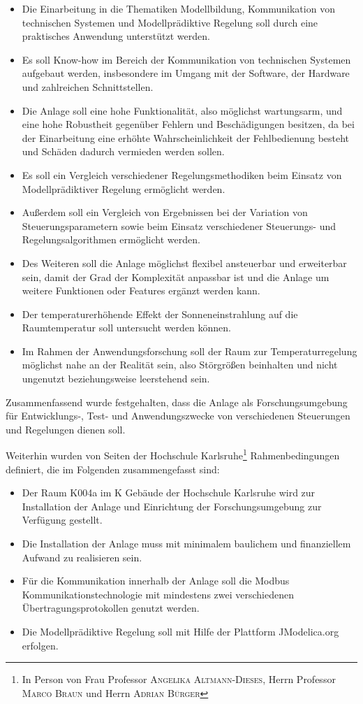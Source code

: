 \begin{itemize}
	\item Die Einarbeitung in die Thematiken Modellbildung, Kommunikation von technischen Systemen und Modellprädiktive Regelung soll durch eine praktisches Anwendung unterstützt werden.
	\item Es soll Know-how im Bereich der Kommunikation von technischen Systemen aufgebaut werden, insbesondere im Umgang mit der Software, der Hardware und zahlreichen Schnittstellen.
	\item Die Anlage soll eine hohe Funktionalität, also möglichst wartungsarm, und eine hohe Robustheit gegenüber Fehlern und Beschädigungen besitzen, da bei der Einarbeitung eine erhöhte Wahrscheinlichkeit der Fehlbedienung besteht und Schäden dadurch vermieden werden sollen.
	\item Es soll ein Vergleich verschiedener Regelungsmethodiken beim Einsatz von Modellprädiktiver Regelung ermöglicht werden.
	\item Außerdem soll ein Vergleich von Ergebnissen bei der Variation von Steuerungsparametern sowie beim Einsatz verschiedener Steuerungs- und Regelungsalgorithmen ermöglicht werden.
	\item Des Weiteren soll die Anlage möglichst flexibel ansteuerbar und erweiterbar sein, damit der Grad der Komplexität anpassbar ist und die Anlage um weitere Funktionen oder Features ergänzt werden kann.
	\item Der temperaturerhöhende Effekt der Sonneneinstrahlung auf die Raumtemperatur soll untersucht werden können.
	\item Im Rahmen der Anwendungsforschung soll der Raum zur Temperaturregelung möglichst nahe an der Realität sein, also Störgrößen beinhalten und nicht ungenutzt beziehungsweise leerstehend sein.
\end{itemize}

Zusammenfassend wurde festgehalten, dass die Anlage als Forschungsumgebung für Entwicklungs-, Test- und Anwendungszwecke von verschiedenen Steuerungen und Regelungen dienen soll.

Weiterhin wurden von Seiten der Hochschule Karlsruhe\footnote{In Person von Frau Professor \textsc{Angelika Altmann-Dieses}, Herrn Professor \textsc{Marco Braun} und Herrn \textsc{Adrian Bürger}} Rahmenbedingungen definiert, die im Folgenden zusammengefasst sind:

\begin{itemize}
	\item Der Raum K004a im K Gebäude der Hochschule Karlsruhe wird zur Installation der Anlage und Einrichtung der Forschungsumgebung zur Verfügung gestellt.
	\item Die Installation der Anlage muss mit minimalem baulichem und finanziellem Aufwand zu realisieren sein.
	\item Für die Kommunikation innerhalb der Anlage soll die Modbus Kommunikationstechnologie mit mindestens zwei verschiedenen Übertragungsprotokollen genutzt werden.
	\item Die Modellprädiktive Regelung soll mit Hilfe der Plattform JModelica.org erfolgen.
\end{itemize}

